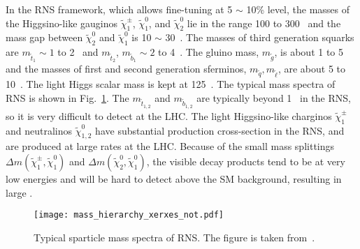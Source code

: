 %
In the RNS framework, which allows fine-tuning at 5 $\sim$ 10\% level, the masses of the Higgsino-like gauginos $\widetilde{\chi}^{\pm}_{1}$, $\widetilde{\chi}^{0}_{1}$, and $\widetilde{\chi}^{0}_{2}$ lie in the range 100 to 300~{\GeV} and the mass gap between $\widetilde{\chi}^{0}_{2}$ and $\widetilde{\chi}^{0}_{1}$ is 10 $\sim$ 30~{\GeV}.
The masses of third generation squarks are $m_{\widetilde{t}_{1}} \sim 1$ to 2~{\TeV} and $m_{\widetilde{t}_{2}}$, $m_{\widetilde{b}_{1}} \sim 2$ to 4~{\TeV}.
The gluino mass, $m_{\widetilde{g}}$, is about 1 to 5~{\TeV} and the masses of first and second generation sferminos, $m_{\widetilde{q}}, m_{\widetilde{\ell}}$, are about 5 to 10~{\TeV}.
The light Higgs scalar mass is kept at 125~{\GeV}.
The typical mass spectra of RNS is shown in Fig.~\ref{fig:susy_RNS_mass_spectra}.
The $m_{\widetilde{t}_{1,2}}$ and $m_{\widetilde{b}_{1,2}}$ are typically beyond 1~{\TeV} in the RNS, so it is very difficult to detect at the LHC.  
The light Higgsino-like charginos $\widetilde{\chi}^{\pm}_{1}$ and neutralinos $\widetilde{\chi}^{0}_{1,2}$ have substantial production cross-section in the RNS, and are produced at large rates at the LHC.
Because of the small mass splittings $\Delta m(\widetilde{\chi}^{\pm}_{1}, \widetilde{\chi}^{0}_{1})$ and $\Delta m(\widetilde{\chi}^{0}_{2}, \widetilde{\chi}^{0}_{1})$, the visible decay products tend to be at very low energies and will be hard to detect above the SM background, resulting in large \met.


\begin{figure}[htb]
    \begin{center}
        \texttt{[image: mass\_hierarchy\_xerxes\_not.pdf]}
        \caption{Typical sparticle mass spectra of RNS.
        The figure is taken from~\cite{Baer:2013gva}.}
        \label{fig:susy_RNS_mass_spectra}
    \end{center}
\end{figure}


